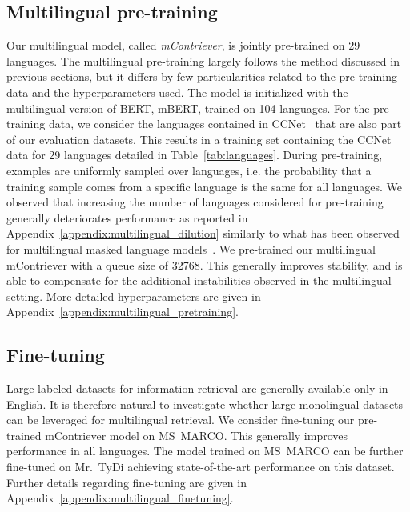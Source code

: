 \documentclass[10pt]{article} %
\def \oursmulti          {mContriever}
\begin{document}
\subsection{Multilingual pre-training}
Our multilingual model, called \emph{\oursmulti{}}, is jointly pre-trained on 29 languages.
The multilingual pre-training largely follows the method discussed in previous sections, but it differs by few particularities related to the pre-training data and the hyperparameters used.
The model is initialized with the multilingual version of BERT, mBERT, trained on 104 languages.
For the pre-training data, we consider the languages contained in CCNet~\citep{wenzek-etal-2020-ccnet} that are also part of our evaluation datasets. 
This results in a training set containing the CCNet data for 29 languages detailed in Table~\ref{tab:languages}. 
During pre-training, examples are uniformly sampled over languages, i.e. the probability that a training sample comes from a specific language is the same for all languages.
We observed that increasing the number of languages considered for pre-training generally deteriorates performance as reported in Appendix~\ref{appendix:multilingual_dilution} similarly to what has been observed for multilingual masked language models~\citep{conneau2020xlmr}.
We pre-trained our multilingual \oursmulti{} with a queue size of 32768.
This generally improves stability, and is able to compensate for the additional instabilities observed in the multilingual setting.
More detailed hyperparameters are given in Appendix~\ref{appendix:multilingual_pretraining}. 


\subsection{Fine-tuning}
Large labeled datasets for information retrieval are generally available only in English.
It is therefore natural to investigate whether large monolingual datasets can be leveraged for multilingual retrieval.
We consider fine-tuning our pre-trained \oursmulti{} model on MS~MARCO.
This generally improves performance in all languages.
The model trained on MS~MARCO can be further fine-tuned on Mr.~TyDi achieving state-of-the-art performance on this dataset.
Further details regarding fine-tuning are given in Appendix~\ref{appendix:multilingual_finetuning}.
\end{document}
